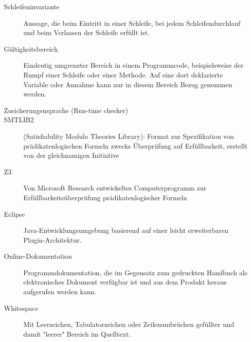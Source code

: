 \begin{description}
    \item[Schleifeninvariante] Aussage, die beim Eintritt in einer Schleife, bei jedem Schleifendurchlauf und beim Verlassen der Schleife erfüllt ist.
    \item[Gültigkeitsbereich] Eindeutig umgrenzter Bereich in einem Programmcode, beispielsweise der Rumpf einer Schleife oder einer Methode. Auf eine dort deklarierte Variable oder Annahme kann nur in diesem Bereich Bezug genommen werden.
    \item[Zusicherungensprache (Run-time checker)]
    \item[SMTLIB2] (Satisfiability Modulo Theories Library): Format zur Spezifikation von prädikatenlogischen Formeln zwecks Überprüfung auf Erfüllbarkeit, erstellt von der gleichnamigen Initiative
    \item[Z3] Von Microsoft Research entwickeltes Computerprogramm zur Erfüllbarkeitsüberprüfung prädikatenlogischer Formeln
    \item[Eclipse] Java-Entwicklungsumgebung basierend auf einer leicht erweiterbaren Plugin-Architektur.
    \item[Online-Dokumentation] Programmdokumentation, die im Gegensatz zum gedruckten Handbuch als elektronisches Dokument verfügbar ist und aus dem Produkt heraus aufgerufen werden kann.
    \item[Whitespace] Mit Leerzeichen, Tabulatorzeichen oder Zeilenumbrüchen gefüllter und damit "leerer" Bereich im Quelltext.
\end{description}

